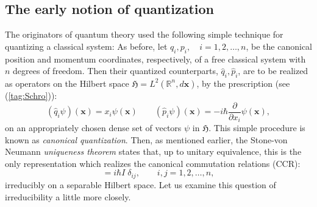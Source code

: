 \documentclass[12pt]{amsart}
\numberwithin{equation}{section}
\theoremstyle{remark}
\newcommand\HH{\mathfrak H}
\newcommand{\be}{\begin{equation}}
\newcommand{\en}{\end{equation}}
\newcommand{\bx}{\mathbf x}
\begin{document}
\subsection{The early notion of quantization}
\label{sec-earlynotion}

The originators of quantum theory used the following simple technique
for quantizing a classical system: As before, let
 $q_{i}, p_{i}, \quad i = 1,2,
\ldots , n$, be the canonical position and momentum coordinates, respectively,
of a free classical system with $n$ degrees of freedom. Then their quantized
counterparts, $\widehat{q}_{i}, \widehat{p}_{i}$, are to be realized as
operators on the Hilbert space $\HH = L^{2}({\mathbb R}^{n}, d\bx)$, by the
prescription (see (\ref{tag:Schro})):
\be
  (\widehat{q}_{i}\psi )(\bx ) = x_{i}\psi (\bx )  \qquad
    (\widehat{p}_{i}\psi )(\bx ) = -i\hbar
    \frac {\partial}{\partial x_{i}}\psi (\bx),
\label{canquant1}
\en
on an appropriately chosen dense set of vectors $\psi$ in $\HH$. This simple
procedure is known as {\em canonical quantization\/}.   Then, as mentioned
earlier, the Stone-von Neumann {\em uniqueness theorem} \cite{bib:vNeu} states
that, up to unitary equivalence,
this is the only
representation which realizes the canonical commutation relations (CCR):
\be
 [\widehat{q}_{i}, \widehat{p}_{j}] = i\hbar I\; \delta_{ij},
      \qquad i,j = 1,2, \ldots, n,
\label{CCR4}
\en
irreducibly on a separable Hilbert space. Let us examine this question
of irreducibility a little more closely.
\end{document}

